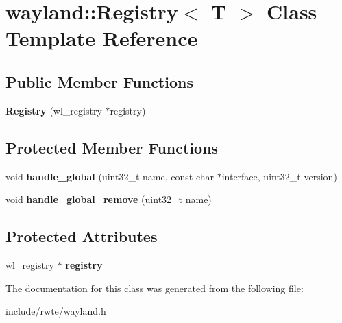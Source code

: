 \hypertarget{classwayland_1_1Registry}{}\section{wayland\+::Registry$<$ T $>$ Class Template Reference}
\label{classwayland_1_1Registry}
\subsection*{Public Member Functions}
\begin{DoxyCompactItemize}
\item 
\mbox{\label{classwayland_1_1Registry_a35cacb58ca2680a7e1dddeb945466529}} 
{\bfseries Registry} (wl\+\_\+registry $\ast$registry)
\end{DoxyCompactItemize}
\subsection*{Protected Member Functions}
\begin{DoxyCompactItemize}
\item 
\mbox{\label{classwayland_1_1Registry_a1735473d26224879ffcd9c28f58927ad}} 
void {\bfseries handle\+\_\+global} (uint32\+\_\+t name, const char $\ast$interface, uint32\+\_\+t version)
\item 
\mbox{\label{classwayland_1_1Registry_a3dc773e2a7ec39fb34ee1ca44e536fe2}} 
void {\bfseries handle\+\_\+global\+\_\+remove} (uint32\+\_\+t name)
\end{DoxyCompactItemize}
\subsection*{Protected Attributes}
\begin{DoxyCompactItemize}
\item 
\mbox{\label{classwayland_1_1Registry_aa30eadd4ae0bdcf20f8bb9251e2eafe9}} 
wl\+\_\+registry $\ast$ {\bfseries registry}
\end{DoxyCompactItemize}


The documentation for this class was generated from the following file\+:\begin{DoxyCompactItemize}
\item 
include/rwte/wayland.\+h\end{DoxyCompactItemize}
